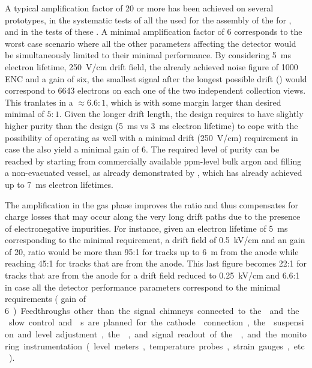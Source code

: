 A typical amplification factor of 20 or more has been achieved on several prototypes, in the systematic tests of all the  used for the assembly of the  for , and in the \coldbox tests of these . A minimal   amplification factor of 6 corresponds to the worst case scenario where all the other parameters affecting the detector  would be simultaneously limited to their minimal performance. By considering   \SI{5}{ms} electron lifetime,  \SI{250}{V/cm} drift field, the already achieved noise figure of 1000 ENC and a   gain of six,  the smallest  signal after the longest possible drift (\dpmaxdrift{})  would correspond to \num{6643} electrons on each one of the two independent collection views. This tranlates in a  $\approx  \num{6.6}:\num{1}$, which is with some margin larger than desired minimal  of $\num{5}:\num{1}$.
Given the longer drift length, the  design requires  to have slightly higher purity than the  design (\SI{5}{ms} vs \SI{3}{ms}  electron lifetime) to cope with the possibility of operating as well with a minimal drift \efield (\SI{250}{V/cm}) requirement in case the  also yield a minimal gain of \num{6}. The required level of purity can be reached by starting from  commercially available ppm-level bulk argon and filling a non-evacuated vessel, as already demonstrated by , which has already achieved up to \SI{7}{ms} electron lifetimes.

The amplification in the gas phase improves the  ratio and thus compensates for charge losses that may occur along the very long drift paths due to the presence of  electronegative impurities.  For instance, given an electron lifetime of \SI{5}{ms} corresponding to the minimal requirement,  a drift field of \SI{0.5}{kV/cm} and an  gain of \num{20},  ratio would be more than  \num{95}:\num{1} for tracks up to \SI{6}{m} from the anode while reaching  \num{45}:\num{1} for   tracks that are \dpmaxdrift from the anode. This last figure becomes  \num{22}:\num{1} for   tracks that are \dpmaxdrift from the anode for a drift field reduced to  \SI{0.25}{kV/cm} and \num{6.6}:\num{1} in case all the detector performance parameters correspond to the minimal requirements ( gain of  \SI{6}).

Feedthroughs other than the signal chimneys connected to the  and the  slow control and \fdth{}s are planned for the cathode  connection, the  suspension and level adjustment, the , and signal readout of the , and the monitoring instrumentation (level meters, temperature probes, strain gauges, etc.).

